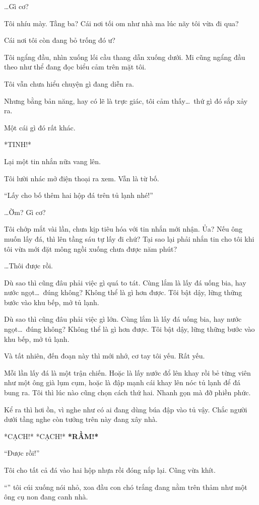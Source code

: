 \documentclass[../main.tex]{subfiles}
\begin{document}
\dots Gì cơ?

Tôi nhíu mày. Tầng ba? Cái nơi tối om như nhà ma lúc nãy tôi vừa đi qua?

Cái nơi tôi còn đang bỏ trống đó ư?

Tôi ngẩng đầu, nhìn xuống lối cầu thang dẫn xuống dưới. Mi cũng ngẩng đầu theo như thể đang đọc biểu cảm trên mặt tôi.

Tôi vẫn chưa hiểu chuyện gì đang diễn ra.

Nhưng bằng bản năng, hay có lẽ là trực giác, tôi cảm thấy\dots\ thứ gì đó sắp xảy ra.

Một cái gì đó rất khác.

*TINH!*

Lại một tin nhắn nữa vang lên.

Tôi lười nhác mở điện thoại ra xem. Vẫn là từ bố.

``Lấy cho bố thêm hai hộp đá trên tủ lạnh nhé!''

\dots Ờm? Gì cơ?

Tôi chớp mắt vài lần, chưa kịp tiêu hóa với tin nhắn mới nhận. Ủa? Nếu ông muốn lấy đá, thì lên tầng sáu tự lấy đi chứ? Tại sao lại phải nhắn tin cho tôi khi tôi vừa mới đặt mông ngồi xuống chưa được năm phút?

\dots Thôi được rồi.

Dù sao thì cũng đâu phải việc gì quá to tát. Cùng lắm là lấy đá uống bia, hay nước ngọt\dots\ đúng không? Không thể là gì hơn được. Tôi bật dậy, lững thững bước vào khu bếp, mở tủ lạnh.

Dù sao thì cũng đâu phải việc gì lớn. Cùng lắm là lấy đá uống bia, hay nước ngọt\dots\ đúng không? Không thể là gì hơn được. Tôi bật dậy, lững thững bước vào khu bếp, mở tủ lạnh.

Và tất nhiên, đến đoạn này thì mới nhớ, cơ tay tôi yếu. Rất yếu.

Mỗi lần lấy đá là một trận chiến. Hoặc là lấy nước đổ lên khay rồi bẻ từng viên như một ông già lụm cụm, hoặc là đập mạnh cái khay lên nóc tủ lạnh để đá bung ra. Tôi thì lúc nào cũng chọn cách thứ hai. Nhanh gọn mà đỡ phiền phức.

Kể ra thì hơi ồn, vì nghe như có ai đang dùng búa đập vào tủ vậy. Chắc người dưới tầng nghe còn tưởng trên này đang xây nhà.

*CẠCH!* *CẠCH!* \textbf{*RẦM!*}

``Được rồi!''

Tôi cho tất cả đá vào hai hộp nhựa rồi đóng nắp lại. Cũng vừa khít.

``'' tôi cúi xuống nói nhỏ, xoa đầu con chó trắng đang nằm trên thảm như một ông cụ non đang canh nhà.
\end{document}
